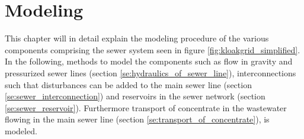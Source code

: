 \chapter{Modeling}\label{se:modeling}

This chapter will in detail explain the modeling procedure of the various components comprising the sewer system seen in figure \ref{fig:kloakgrid_simplified}.
In the following, methods to model the components such as flow in gravity and pressurized sewer lines (section \ref{se:hydraulics_of_sewer_line}), interconnections such that disturbances can be added to the main sewer line (section \ref{se:sewer_interconnection}) and reservoirs in the sewer network (section \ref{se:sewer_reservoir}). Furthermore transport of concentrate in the wastewater flowing in the main sewer line (section \ref{se:transport_of_concentrate}), is modeled.






